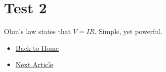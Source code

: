 \documentclass{article}
\begin{document}
\section*{Test 2}

Ohm's law states that \( V = IR \). Simple, yet powerful.

\begin{itemize}
  \item \href{../index.html}{Back to Home}
  \item \href{test1.html}{Next Article}
\end{itemize}
\end{document}

